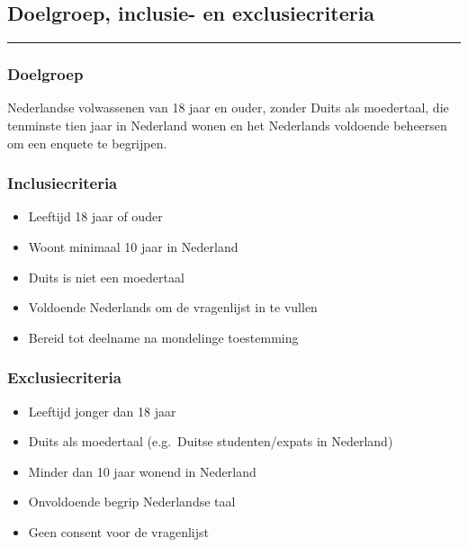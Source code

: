\documentclass[
]{article}
\providecommand{\tightlist}{%
  \setlength{\itemsep}{0pt}\setlength{\parskip}{0pt}}
\begin{document}
\subsection{Doelgroep, inclusie- en
exclusiecriteria}\label{doelgroep-inclusie--en-exclusiecriteria}

\begin{center}\rule{0.5\linewidth}{0.5pt}\end{center}

\subsubsection{Doelgroep}\label{doelgroep}

Nederlandse volwassenen van 18 jaar en ouder, zonder Duits als
moedertaal, die tenminste tien jaar in Nederland wonen en het Nederlands
voldoende beheersen om een enquete te begrijpen.

\subsubsection{Inclusiecriteria}\label{inclusiecriteria}

\begin{itemize}
\tightlist
\item
  Leeftijd 18 jaar of ouder
\item
  Woont minimaal 10 jaar in Nederland
\item
  Duits is niet een moedertaal
\item
  Voldoende Nederlands om de vragenlijst in te vullen
\item
  Bereid tot deelname na mondelinge toestemming
\end{itemize}

\subsubsection{Exclusiecriteria}\label{exclusiecriteria}

\begin{itemize}
\tightlist
\item
  Leeftijd jonger dan 18 jaar
\item
  Duits als moedertaal (e.g.~Duitse studenten/expats in Nederland)
\item
  Minder dan 10 jaar wonend in Nederland
\item
  Onvoldoende begrip Nederlandse taal
\item
  Geen consent voor de vragenlijst
\end{itemize}
\end{document}
